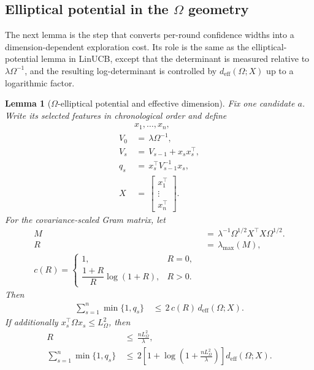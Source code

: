 \documentclass{article} %
\newtheorem{lemma}[theorem]{Lemma}
\begin{document}
\subsection{\texorpdfstring{Elliptical potential in the \(\Omega\) geometry}{Elliptical potential in the Omega geometry}}

The next lemma is the step that converts per-round confidence widths into a dimension-dependent exploration cost.  Its role is the same as the elliptical-potential lemma in LinUCB, except that the determinant is measured relative to \(\lambda\Omega^{-1}\), and the resulting log-determinant is controlled by \(d_{\mathrm{eff}}(\Omega;X)\) up to a logarithmic factor.

\begin{lemma}[\(\Omega\)-elliptical potential and effective dimension]
\label{lem:hyper-elliptical}
Fix one candidate \(a\). Write its selected features in chronological order
and define
\begin{align}
&x_1,\ldots,x_n,
\label{eq:hyper-elliptical-features}
\\
V_0
&\,=\,
\lambda\Omega^{-1},
\label{eq:hyper-elliptical-V0}
\\
V_s
&\,=\,
V_{s-1}+x_sx_s^\top,
\label{eq:hyper-elliptical-Vs}
\\
q_s
&\,=\,
x_s^\top V_{s-1}^{-1}x_s,
\label{eq:hyper-elliptical-qs}
\\
X
&\,=\,
\begin{bmatrix}
x_1^\top\\
\vdots\\
x_n^\top
\end{bmatrix}.
\label{eq:hyper-elliptical-X}
\end{align}
For the covariance-scaled Gram matrix, let
\begin{align}
M
&\,=\,
\lambda^{-1}\Omega^{1/2}X^\top X\Omega^{1/2}.
\label{eq:hyper-elliptical-M}
\\
R
&\,=\,
\lambda_{\max}(M),
\label{eq:hyper-elliptical-R}
\\
c(R)=
\begin{cases}
1, & R=0,\\[2mm]
\dfrac{1+R}{R}\log(1+R), & R>0 .
\end{cases}
\label{eq:hyper-elliptical-cR}
\end{align}
Then
\begin{equation}
\label{eq:hyper-elliptical-main}
\begin{aligned}
\sum_{s=1}^n \min\{1,q_s\}
&\,\leq\,
2\,c(R)\,d_{\mathrm{eff}}(\Omega;X).
\end{aligned}
\end{equation}
If additionally \(x_s^\top\Omega x_s\le L_{\Omega}^2\), then
\begin{align}
R
&\,\leq\,
\frac{nL_{\Omega}^2}{\lambda},
\label{eq:hyper-elliptical-radius}
\\
\sum_{s=1}^n \min\{1,q_s\}
&\,\leq\,
2
\left[
1+
\log\!\left(1+\frac{nL_{\Omega}^2}{\lambda}\right)
\right]
d_{\mathrm{eff}}(\Omega;X).
\label{eq:hyper-elliptical-logT}
\end{align}
\end{lemma}
\end{document}
